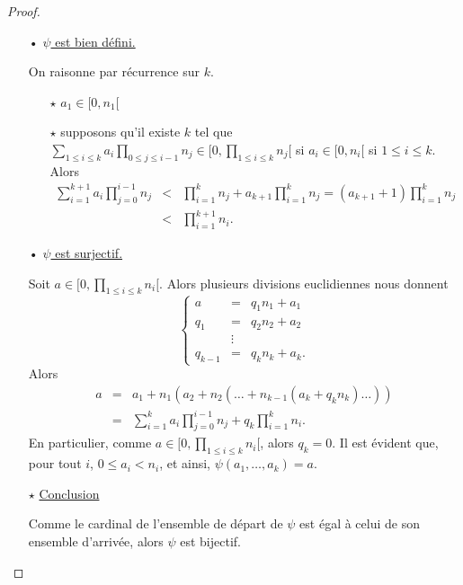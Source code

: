 \documentclass[10pt,a4paper]{report}
\begin{document}
\begin{proof}\
\begin{itemize}
\item[•] \underline{$\psi$ est bien défini.}\par 
On raisonne par récurrence sur $k$.
\begin{itemize}
\item[$\star$] $a_1 \in [0,n_1 [$
\item[$\star$]supposons qu'il existe $k$ tel que $\sum_{1 \leqslant i \leqslant k }a_i \prod_{0 \leqslant j \leqslant i-1}n_j \in [0, \prod_{1 \leqslant i \leqslant k}n_j [ $ si $a_i \in [0,n_i[$ si $1 \leqslant i \leqslant k $. Alors
\begin{eqnarray*}   
 \sum_{ i=1}^{ k+1 }a_i \prod_{j=0}^{ i-1}n_j  &<& \prod_{ i=1}^{ k}n_j + a_{k+1}    \prod_{ i=1}^{k}n_j =(a_{k+1}+1)  \prod_{ i=1}^{ k}n_j \\
           & < & \prod_{ i=1}^{ k+1} n_i .
\end{eqnarray*} 
\end{itemize}
\item[•]\underline{$\psi$ est surjectif.} \par 
Soit $a \in [0, \prod_{1 \leqslant i \leqslant k }n_i[$. Alors plusieurs divisions euclidiennes nous donnent
\begin{equation*}
\left \{ \begin{array}{lcr}
a&=& q_1 n_1 +a_1 \\
q_1 &=& q_2 n_2 +a_2\\
& \vdots &      \\
q_{k-1} &=& q_k n_k +a_k.   
\end{array} \right.
\end{equation*}
Alors
 \begin{eqnarray*}
a &=& a_1 +  n_1 (  a_2 + n_2 (\ldots +n_{k-1}(a_k+q_k n_k) \ldots ))\\ 
  &=& \sum_{i=1}^k a_i \prod_{j=0}^{i-1} n_j + q_k \prod_{i=1}^k n_i.
\end{eqnarray*}
En particulier, comme $a \in [ 0, \prod_{1 \leqslant i \leqslant k}n_i [$, alors $q_k=0$. Il est évident que, pour tout $i$, $0 \leqslant a_i < n_i $, et ainsi, $\psi(a_1, \ldots, a_k)=a$.
\item[$\star$] \underline{Conclusion}\par 
Comme le cardinal de l'ensemble de départ de $\psi$ est égal à celui de son ensemble d'arrivée, alors $\psi$ est bijectif.
\end{itemize}
\end{proof}
 
\end{document}
